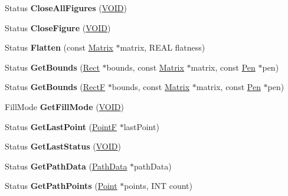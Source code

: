 \begin{DoxyCompactItemize}
Status {\bfseries Close\+All\+Figures} (\hyperlink{interfacevoid}{V\+O\+ID})
\item 
\mbox{\label{class_graphics_path_a18257393a03d81e5a6188f73e6afc575}} 
Status {\bfseries Close\+Figure} (\hyperlink{interfacevoid}{V\+O\+ID})
\item 
\mbox{\label{class_graphics_path_ae314354dfdd2040348c6f09603dd603d}} 
Status {\bfseries Flatten} (const \hyperlink{class_matrix}{Matrix} $\ast$matrix, R\+E\+AL flatness)
\item 
\mbox{\label{class_graphics_path_adb1c25ae7861e100543051738af3a98e}} 
Status {\bfseries Get\+Bounds} (\hyperlink{struct_rect}{Rect} $\ast$bounds, const \hyperlink{class_matrix}{Matrix} $\ast$matrix, const \hyperlink{class_pen}{Pen} $\ast$pen)
\item 
\mbox{\label{class_graphics_path_ab13d9a6708aad2d8da024a921de88e67}} 
Status {\bfseries Get\+Bounds} (\hyperlink{struct_rect_f}{RectF} $\ast$bounds, const \hyperlink{class_matrix}{Matrix} $\ast$matrix, const \hyperlink{class_pen}{Pen} $\ast$pen)
\item 
\mbox{\label{class_graphics_path_a02b4a4992c5f34ad1bb3bf087d301bfb}} 
Fill\+Mode {\bfseries Get\+Fill\+Mode} (\hyperlink{interfacevoid}{V\+O\+ID})
\item 
\mbox{\label{class_graphics_path_ae3ef2055d6f08171a6fab135ea631a0a}} 
Status {\bfseries Get\+Last\+Point} (\hyperlink{struct_point_f}{PointF} $\ast$last\+Point)
\item 
\mbox{\label{class_graphics_path_adcbe57c5dcb296c62c86baeb3d9e04cf}} 
Status {\bfseries Get\+Last\+Status} (\hyperlink{interfacevoid}{V\+O\+ID})
\item 
\mbox{\label{class_graphics_path_a8564e2c9919a632dfa038441b5fb6865}} 
Status {\bfseries Get\+Path\+Data} (\hyperlink{struct_path_data}{Path\+Data} $\ast$path\+Data)
\item 
\mbox{\label{class_graphics_path_acfbc4a960eab10875fbeb330cf2f5470}} 
Status {\bfseries Get\+Path\+Points} (\hyperlink{struct_point}{Point} $\ast$points, I\+NT count)

\end{DoxyCompactItemize}
